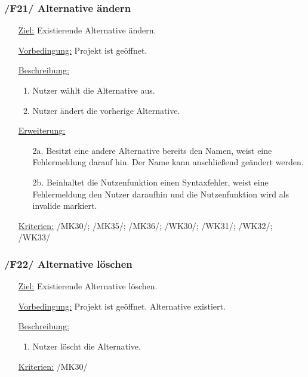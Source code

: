 \documentclass{article}
\begin{document}
\subsubsection*{\textbf{/F21/} Alternative ändern} \label{sec:f:Alternative ändern}
\begin{itemize}
    \item[\underline{Ziel:}] Existierende Alternative ändern.
    \item[\underline{Vorbedingung:}] Projekt ist geöffnet. 
    \item[\underline{Beschreibung:}]
    \begin{enumerate}
        \item Nutzer wählt die Alternative aus.
        \item Nutzer ändert die vorherige Alternative.
    \end{enumerate}
    \item[\underline{Erweiterung:}]
    \begin{itemize}
        \item[2a.] Besitzt eine andere Alternative bereits den Namen, weist eine Fehlermeldung darauf hin. Der Name kann anschließend geändert werden.
        \item[2b.] Beinhaltet die Nutzenfunktion einen Syntaxfehler, weist eine Fehlermeldung den Nutzer daraufhin und die Nutzenfunktion wird als invalide markiert. 
    \end{itemize}
    \item[\underline{Kriterien:}] /MK30/; /MK35/; /MK36/; /WK30/; /WK31/; /WK32/; /WK33/
\end{itemize}

\subsubsection*{\textbf{/F22/} Alternative löschen} \label{sec:f:Alternative löschen}
\begin{itemize}
    \item[\underline{Ziel:}] Existierende Alternative löschen.
    \item[\underline{Vorbedingung:}] Projekt ist geöffnet. Alternative existiert.
    \item[\underline{Beschreibung:}]
    \begin{enumerate}
        \item Nutzer löscht die Alternative.
    \end{enumerate}
    \item[\underline{Kriterien:}] /MK30/
\end{itemize}
\end{document}
